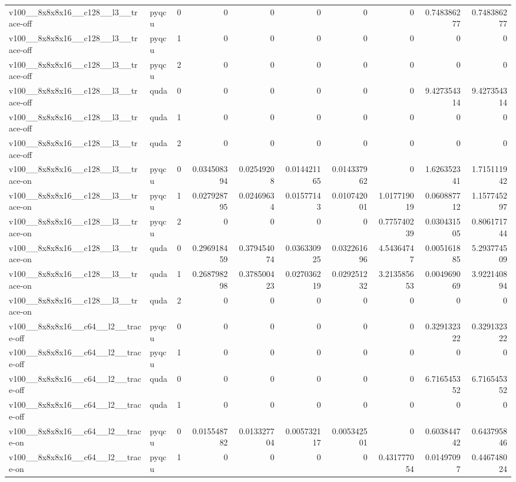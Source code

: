 \begin{table}[htbp]
\begin{tabular}{@{}llrrrrrrrr@{}}
v100\_\_8x8x8x16\_\_c128\_\_l3\_\_trace-off & pyqcu & 0 & 0 & 0 & 0 & 0 & 0 & 0.748386277 & 0.748386277 \\
v100\_\_8x8x8x16\_\_c128\_\_l3\_\_trace-off & pyqcu & 1 & 0 & 0 & 0 & 0 & 0 & 0 & 0 \\
v100\_\_8x8x8x16\_\_c128\_\_l3\_\_trace-off & pyqcu & 2 & 0 & 0 & 0 & 0 & 0 & 0 & 0 \\
v100\_\_8x8x8x16\_\_c128\_\_l3\_\_trace-off & quda & 0 & 0 & 0 & 0 & 0 & 0 & 9.427354314 & 9.427354314 \\
v100\_\_8x8x8x16\_\_c128\_\_l3\_\_trace-off & quda & 1 & 0 & 0 & 0 & 0 & 0 & 0 & 0 \\
v100\_\_8x8x8x16\_\_c128\_\_l3\_\_trace-off & quda & 2 & 0 & 0 & 0 & 0 & 0 & 0 & 0 \\
v100\_\_8x8x8x16\_\_c128\_\_l3\_\_trace-on & pyqcu & 0 & 0.034508394 & 0.02549208 & 0.014421165 & 0.014337962 & 0 & 1.626352341 & 1.715111942 \\
v100\_\_8x8x8x16\_\_c128\_\_l3\_\_trace-on & pyqcu & 1 & 0.027928795 & 0.02469634 & 0.01577143 & 0.010742001 & 1.017719019 & 0.060887712 & 1.157745297 \\
v100\_\_8x8x8x16\_\_c128\_\_l3\_\_trace-on & pyqcu & 2 & 0 & 0 & 0 & 0 & 0.775740239 & 0.030431505 & 0.806171744 \\
v100\_\_8x8x8x16\_\_c128\_\_l3\_\_trace-on & quda & 0 & 0.296918459 & 0.379454074 & 0.036330925 & 0.032261696 & 4.54364747 & 0.005161885 & 5.293774509 \\
v100\_\_8x8x8x16\_\_c128\_\_l3\_\_trace-on & quda & 1 & 0.268798298 & 0.378500423 & 0.027036219 & 0.029251232 & 3.213585653 & 0.004969069 & 3.922140894 \\
v100\_\_8x8x8x16\_\_c128\_\_l3\_\_trace-on & quda & 2 & 0 & 0 & 0 & 0 & 0 & 0 & 0 \\
v100\_\_8x8x8x16\_\_c64\_\_l2\_\_trace-off & pyqcu & 0 & 0 & 0 & 0 & 0 & 0 & 0.329132322 & 0.329132322 \\
v100\_\_8x8x8x16\_\_c64\_\_l2\_\_trace-off & pyqcu & 1 & 0 & 0 & 0 & 0 & 0 & 0 & 0 \\
v100\_\_8x8x8x16\_\_c64\_\_l2\_\_trace-off & quda & 0 & 0 & 0 & 0 & 0 & 0 & 6.716545352 & 6.716545352 \\
v100\_\_8x8x8x16\_\_c64\_\_l2\_\_trace-off & quda & 1 & 0 & 0 & 0 & 0 & 0 & 0 & 0 \\
v100\_\_8x8x8x16\_\_c64\_\_l2\_\_trace-on & pyqcu & 0 & 0.015548782 & 0.013327704 & 0.005732117 & 0.005342501 & 0 & 0.603844742 & 0.643795846 \\
v100\_\_8x8x8x16\_\_c64\_\_l2\_\_trace-on & pyqcu & 1 & 0 & 0 & 0 & 0 & 0.431777054 & 0.01497097 & 0.446748024 \\

\end{tabular}
\end{table}
